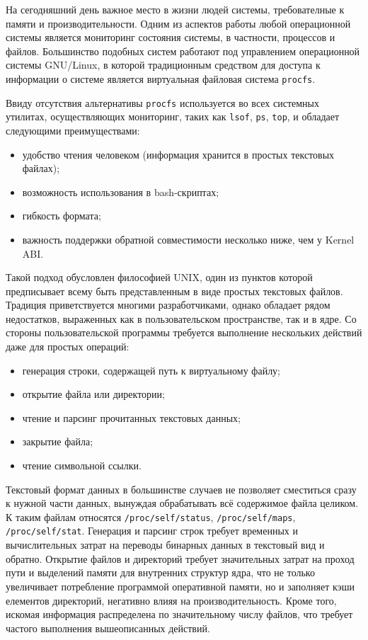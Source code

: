 \label{sec:intro}
На сегодняшний день важное место в жизни людей системы, требователные к памяти и
производительности. Одним из аспектов работы любой операционной системы является
мониторинг состояния системы, в частности, процессов и файлов. Большинство
подобных систем работают под управлением операционной системы GNU/Linux, в
которой традиционным средством для доступа к информации о системе является
виртуальная файловая система \texttt{procfs}.

Ввиду отсутствия альтернативы \texttt{procfs} используется во всех системных
утилитах, осуществляющих мониторинг, таких как \texttt{lsof}, \texttt{ps},
\texttt{top}, и обладает следующими преимуществами:

\begin{itemize}
\item удобство чтения человеком (информация хранится в простых текстовых файлах);
\item возможность использования в bash-скриптах;
\item гибкость формата;
\item важность поддержки обратной совместимости несколько ниже, чем у Kernel ABI.
\end{itemize}

Такой подход обусловлен философией UNIX, один из пунктов которой предписывает
всему быть представленным в виде простых текстовых файлов. Традиция приветствуется
многими  разработчиками,
однако обладает рядом недостатков, выраженных как в пользовательском
пространстве, так и в ядре. Со стороны пользовательской программы требуется
выполнение нескольких действий даже для простых операций:

\begin{itemize}
\item генерация строки, содержащей путь к виртуальному файлу;
\item открытие файла или директории;
\item чтение и парсинг прочитанных текстовых данных;
\item закрытие файла;
\item чтение символьной ссылки.
\end{itemize}

Текстовый формат данных в большинстве случаев не позволяет сместиться сразу к
нужной части данных, вынуждая обрабатывать всё содержимое файла целиком.
К таким файлам относятся \texttt{/proc/self/status},
\texttt{/proc/self/maps}, \texttt{/proc/self/stat}.
Генерация и парсинг строк требует временных и вычислительных затрат на переводы
бинарных данных в текстовый вид и обратно. Открытие файлов и директорий требует
значительных затрат на проход пути и выделений памяти для внутренних структур
ядра, что не только увеличивает потребление программой оперативной памяти, но и
заполняет кэши елементов директорий, негативно влияя на производительность.
Кроме того, искомая информация распределена по значительному числу файлов, что
требует частого выполнения вышеописанных действий.

